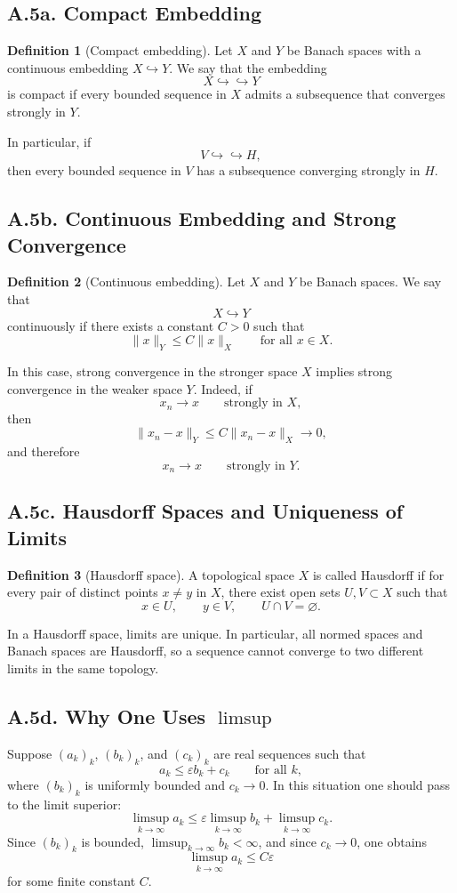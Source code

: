 \documentclass[11pt]{article}
\theoremstyle{definition}
\newtheorem{definition}{Definition}
\theoremstyle{remark}
\begin{document}
\subsection*{A.5a. Compact Embedding}
\begin{definition}[Compact embedding]
Let $X$ and $Y$ be Banach spaces with a continuous embedding $X\hookrightarrow Y$. We say that the embedding
\[
  X\hookrightarrow\hookrightarrow Y
\]
is compact if every bounded sequence in $X$ admits a subsequence that converges strongly in $Y$.
\end{definition}

In particular, if
\[
  V\hookrightarrow\hookrightarrow H,
\]
then every bounded sequence in $V$ has a subsequence converging strongly in $H$.

\subsection*{A.5b. Continuous Embedding and Strong Convergence}
\begin{definition}[Continuous embedding]
Let $X$ and $Y$ be Banach spaces. We say that
\[
  X\hookrightarrow Y
\]
continuously if there exists a constant $C>0$ such that
\[
  \|x\|_Y\le C\|x\|_X
  \qquad \text{for all } x\in X.
\]
\end{definition}

In this case, strong convergence in the stronger space $X$ implies strong convergence in the weaker space $Y$. Indeed, if
\[
  x_n\to x
  \qquad \text{strongly in } X,
\]
then
\[
  \|x_n-x\|_Y
  \le
  C\|x_n-x\|_X\to 0,
\]
and therefore
\[
  x_n\to x
  \qquad \text{strongly in } Y.
\]

\subsection*{A.5c. Hausdorff Spaces and Uniqueness of Limits}
\begin{definition}[Hausdorff space]
A topological space $X$ is called Hausdorff if for every pair of distinct points $x\neq y$ in $X$, there exist open sets $U,V\subset X$ such that
\[
  x\in U,\qquad y\in V,\qquad U\cap V=\varnothing.
\]
\end{definition}

In a Hausdorff space, limits are unique. In particular, all normed spaces and Banach spaces are Hausdorff, so a sequence cannot converge to two different limits in the same topology.

\subsection*{A.5d. Why One Uses $\limsup$}
Suppose $(a_k)_k$, $(b_k)_k$, and $(c_k)_k$ are real sequences such that
\[
  a_k\le \varepsilon b_k+c_k
  \qquad \text{for all } k,
\]
where $(b_k)_k$ is uniformly bounded and $c_k\to 0$. In this situation one should pass to the limit superior:
\[
  \limsup_{k\to\infty} a_k
  \le
  \varepsilon \limsup_{k\to\infty} b_k
  +
  \limsup_{k\to\infty} c_k.
\]
Since $(b_k)_k$ is bounded, $\limsup_{k\to\infty} b_k<\infty$, and since $c_k\to 0$, one obtains
\[
  \limsup_{k\to\infty} a_k\le C\varepsilon
\]
for some finite constant $C$.
\end{document}
